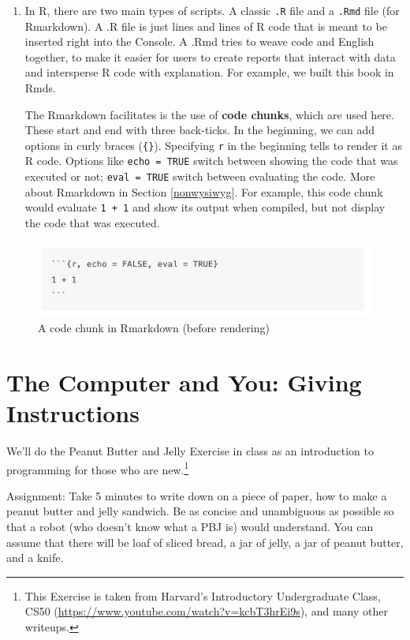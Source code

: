 \documentclass[]{book}
\let\rmarkdownfootnote\footnote%
\def\footnote{\protect\rmarkdownfootnote}
\theoremstyle{definition}
\theoremstyle{definition}
\theoremstyle{definition}
\theoremstyle{remark}
\begin{document}
\begin{enumerate}
\def\labelenumi{\arabic{enumi}.}
\setcounter{enumi}{4}
\item
  In R, there are two main types of scripts. A classic \texttt{.R} file
  and a \texttt{.Rmd} file (for Rmarkdown). A .R file is just lines and
  lines of R code that is meant to be inserted right into the Console. A
  .Rmd tries to weave code and English together, to make it easier for
  users to create reports that interact with data and intersperse R code
  with explanation. For example, we built this book in Rmds.

  The Rmarkdown facilitates is the use of \textbf{code chunks}, which
  are used here. These start and end with three back-ticks. In the
  beginning, we can add options in curly braces (\texttt{\{\}}).
  Specifying \texttt{r} in the beginning tells to render it as R code.
  Options like \texttt{echo\ =\ TRUE} switch between showing the code
  that was executed or not; \texttt{eval\ =\ TRUE} switch between
  evaluating the code. More about Rmarkdown in Section \ref{nonwysiwyg}.
  For example, this code chunk would evaluate \texttt{1\ +\ 1} and show
  its output when compiled, but not display the code that was executed.
\end{enumerate}

\begin{figure}
\centering
\includegraphics{images/11_4_codechunk.png}
\caption{A code chunk in Rmarkdown (before rendering)}
\end{figure}

\section{The Computer and You: Giving
Instructions}\label{the-computer-and-you-giving-instructions}

We'll do the Peanut Butter and Jelly Exercise in class as an
introduction to programming for those who are new.\footnote{This
  Exercise is taken from Harvard's Introductory Undergraduate Class,
  CS50 (\url{https://www.youtube.com/watch?v=kcbT3hrEi9s}), and many
  other writeups.}

Assignment: Take 5 minutes to write down on a piece of paper, how to
make a peanut butter and jelly sandwich. Be as concise and unambiguous
as possible so that a robot (who doesn't know what a PBJ is) would
understand. You can assume that there will be loaf of sliced bread, a
jar of jelly, a jar of peanut butter, and a knife.
\end{document}
